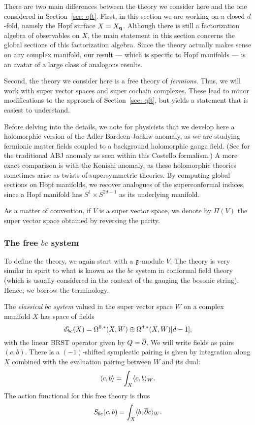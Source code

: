There are two main differences between the theory we consider here and the one considered in Section~\ref{sec: qft}.
First, in this section we are working on a closed $d$-fold, namely the Hopf surface $X = X_{\bf q}$. 
Although there is still a factorization algebra of observables on $X$, the main statement in this section concerns the global sections of this factorization algebra.
Since the theory actually makes sense on any complex manifold, 
our result --- which is specific to Hopf manifolds --- is an avatar of a large class of analogous results.

Second, the theory we consider here is a free theory of {\em fermions}. 
Thus, we will work with super vector spaces and super cochain complexes.
These lead to minor modifications to the approach of Section~\ref{sec: qft}, 
but yields a statement that is easiest to understand.

Before delving into the details, 
we note for physicists that we develop here a holomorphic version of the Adler-Bardeen-Jackiw anomaly,
as we are studying fermionic matter fields coupled to a background holomorphic gauge field.
(See \cite{Rabinovich} for the traditional ABJ anomaly as seen within this Costello formalism.)
A more exact comparison is with the Konishi anomaly, 
as these holomorphic theories sometimes arise as twists of supersymmetric theories.
By computing global sections on Hopf manifolds,
we recover analogues of the superconformal indices,
since a Hopf manifold has $S^1 \times S^{2d-1}$ as its underlying manifold.


\begin{rmk}
As a matter of convention, if $V$ is a super vector space, we denote by $\Pi(V)$ the super vector space obtained by reversing the parity. 
\end{rmk}

\subsubsection{The free $bc$ system}

To define the theory, we again start with a $\mathfrak g$-module $V$.
The theory is very similar in spirit to what is known as the $bc$ system in conformal field theory (which is usually considered in the context of the gauging the bosonic string). 
Hence, we borrow the terminology. 

\begin{dfn}
The {\em classical $bc$ system} valued in the super vector space $W$ on a complex manifold $X$ has space of fields
\[
\mathscr E_{bc} (X) = \Omega^{0,*}(X , W) \oplus \Omega^{d,*}(X , W)[d-1],
\]
with the linear BRST operator given by $Q = \overline{\partial}$.
We will write fields as pairs $(c,b)$. 
There is a $(-1)$-shifted symplectic pairing is given by integration along $X$ combined with the evaluation pairing between $W$ and its dual: 
\[
\langle c,b\rangle = \int_X \langle c, b\rangle_{W}.
\] 
The action functional for this free theory is thus
\[
S_{bc} (c,b) = \int_X \langle b , \overline{\partial} c\rangle_{W} .
\]
\end{dfn}

